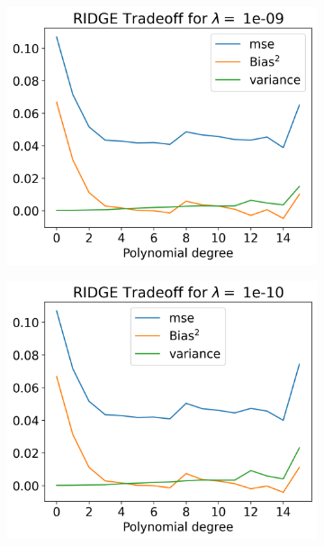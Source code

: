 \documentclass[12pt]{article}
\begin{document}
\begin{figure}[H]
  \begin{subfigure}{.5\textwidth}
    \centering
    \includegraphics[width=\textwidth]{../figures/tradeoff_RIDGE_1e-09.png}
    \caption{}
    \label{fig:l_1e-09}
  \end{subfigure}
  \begin{subfigure}{.5\textwidth}
    \centering
    \includegraphics[width=\textwidth]{../figures/tradeoff_RIDGE_1e-10.png}
    \caption{}
    \label{fig:l_1e-10}
  \end{subfigure}
  \begin{subfigure}{.5\textwidth}

\end{subfigure}
\end{figure}
\end{document}
